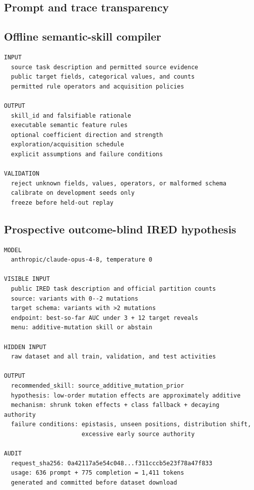 \documentclass[pdflatex,sn-nature]{sn-jnl}
\begin{document}
\begin{appendices}
\section{Prompt and trace transparency}
\label{sec:prompts}

\subsection{Offline semantic-skill compiler}

\begin{lstlisting}[style=carecode]
INPUT
  source task description and permitted source evidence
  public target fields, categorical values, and counts
  permitted rule operators and acquisition policies

OUTPUT
  skill_id and falsifiable rationale
  executable semantic feature rules
  optional coefficient direction and strength
  exploration/acquisition schedule
  explicit assumptions and failure conditions

VALIDATION
  reject unknown fields, values, operators, or malformed schema
  calibrate on development seeds only
  freeze before held-out replay
\end{lstlisting}

\subsection{Prospective outcome-blind IRED hypothesis}

\begin{lstlisting}[style=carecode]
MODEL
  anthropic/claude-opus-4-8, temperature 0

VISIBLE INPUT
  public IRED task description and official partition counts
  source: variants with 0--2 mutations
  target schema: variants with >2 mutations
  endpoint: best-so-far AUC under 3 + 12 target reveals
  menu: additive-mutation skill or abstain

HIDDEN INPUT
  raw dataset and all train, validation, and test activities

OUTPUT
  recommended_skill: source_additive_mutation_prior
  hypothesis: low-order mutation effects are approximately additive
  mechanism: shrunk token effects + class fallback + decaying authority
  failure conditions: epistasis, unseen positions, distribution shift,
                      excessive early source authority

AUDIT
  request_sha256: 0a42117a5e54c048...f311cccb5e23f78a47f833
  usage: 636 prompt + 775 completion = 1,411 tokens
  generated and committed before dataset download
\end{lstlisting}


\end{appendices}
\end{document}
